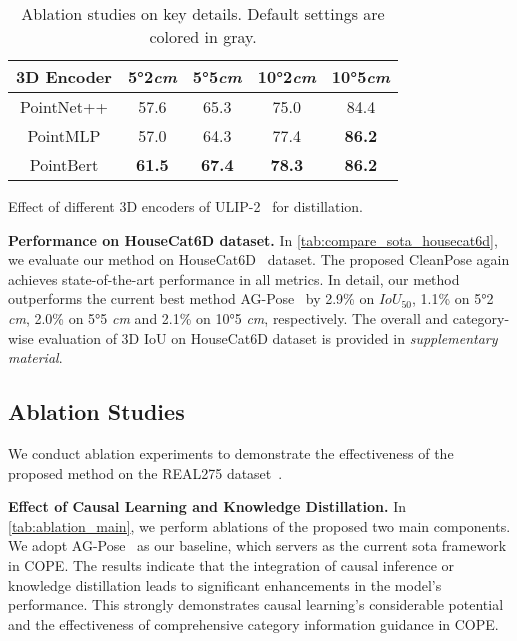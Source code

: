 \begin{table}[htbp]
    \begin{subtable}[t]{1.0\linewidth}  %
        \centering
        \setlength\tabcolsep{7pt}%
        \begin{tabular}{c|cccc}
            \toprule
            3D Encoder & 5°2\emph{cm} & 5°5\emph{cm} & 10°2\emph{cm}  & 10°5\emph{cm}\\
            \midrule
            PointNet++\cite{qi2017pointnet++}  & 57.6          &65.3    &75.0 &84.4   \\
            PointMLP\cite{ma2022rethinking} & 57.0          &64.3    &77.4 &\textbf{86.2}   \\
            \rowcolor{mygray}
            PointBert\cite{yu2022point} & \textbf{61.5}          &\textbf{67.4}    &\textbf{78.3} &\textbf{86.2}   \\
            \bottomrule
        \end{tabular}
        \caption{Effect of different 3D encoders of ULIP-2~\cite{xue2024ulip} for distillation.}
        \label{tab:ab_dis_encoder}
    \end{subtable}
    \vspace{-0.2cm}
    \caption{Ablation studies on key details. Default settings are colored in \colorbox{mygray}{gray}.}
    \vspace{-0.4cm}
    \label{table:ablation_detail}
    
\end{table}


\noindent
{\bf Performance on HouseCat6D dataset.}
In \cref{tab:compare_sota_housecat6d}, we evaluate our method on HouseCat6D~\cite{jung2024housecat6d} dataset.
The proposed CleanPose again achieves state-of-the-art performance in all metrics. In detail, our method outperforms the current best method AG-Pose~\cite{lin2024instance} by 2.9\% on $IoU_{50}$, 1.1\% on 5°2 \emph{cm}, 2.0\% on 5°5 \emph{cm} and 2.1\% on 10°5 \emph{cm}, respectively.
The overall and category-wise evaluation of 3D IoU on HouseCat6D dataset is provided in \emph{supplementary material}.




\subsection{Ablation Studies}
\label{sec:ablation_studies}
We conduct ablation experiments to demonstrate the effectiveness of the proposed method on the REAL275 dataset~\cite{wang2019normalized}.


\noindent
{\bf Effect of Causal Learning and Knowledge Distillation.} In \cref{tab:ablation_main}, we perform ablations of the proposed two main components. We adopt AG-Pose~\cite{lin2024instance} as our baseline, which servers as the current sota framework in COPE.
The results indicate that the integration of causal inference or knowledge distillation leads to significant enhancements in the model’s performance. This strongly demonstrates causal learning's considerable potential and the effectiveness of comprehensive category information guidance in COPE.

